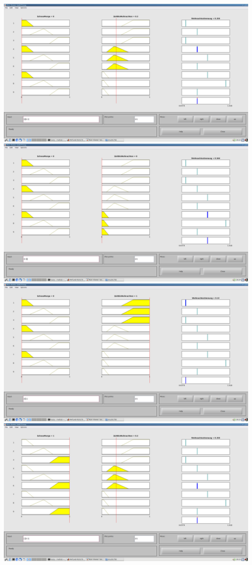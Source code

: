 \includegraphics[width=\textwidth]{part/screenshots/fuzzy-17d-0-0,3}
\includegraphics[width=\textwidth]{part/screenshots/fuzzy-17d-0-0}
\includegraphics[width=\textwidth]{part/screenshots/fuzzy-17d-0-1}
\includegraphics[width=\textwidth]{part/screenshots/fuzzy-17d-1-0,3}
